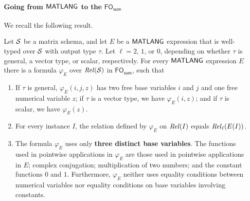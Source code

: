 \paragraph{Going from $\mathsf{MATLANG}$ to the $\textsf{FO}_{\textsf{sum}}$}
We recall the following result.
\begin{proposition} 
Let $\mathcal{S}$ be a matrix schema, and let $E$ be a $\mathsf{MATLANG}$ expression
that is well-typed over $\mathcal{S}$ with output type $\tau$.
Let $\ell=2$, $1$,
or $0$, depending on whether $\tau$ is general, a vector type, or
scalar, respectively.
For every $\mathsf{MATLANG}$ expression $E$ there is a formula
$\varphi_E$ over $\mathit{Rel}(\mathcal{S})$
in $\textsf{FO}_{\textsf{sum}}$, such that
\begin{enumerate}
\item
If\/ $\tau$ is general, $\varphi_E(i,j,z)$ has two free base
variables $i$ and $j$ and one free numerical variable $z$; if\/
$\tau$ is a vector type, we have $\varphi_E(i,z)$; and if\/ $\tau$ is
scalar, we have $\varphi_E(z)$.
\item
For every instance $I$, the relation defined by $\varphi_E$ on
$\mathit{Rel}(I)$ equals $\mathit{Rel}_\ell(E(I))$.
\item
The formula $\varphi_E$ uses only {\bf three distinct base variables}. The functions used in pointwise applications in $\varphi_E$ 
 are those used in
pointwise applications in $E$; complex conjugation;
multiplication of two numbers;
and the constant functions $0$ and $1$.
 Furthermore, $\varphi_E$ neither uses equality conditions between numerical variables nor equality conditions on base variables involving constants.
\end{enumerate}
\end{proposition}

